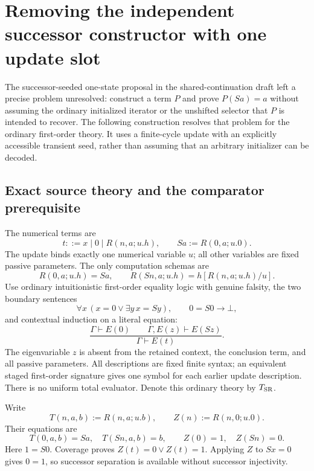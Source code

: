 \section{Removing the independent successor constructor with one update slot}
\label{sec:sr-predecessor}

The successor-seeded one-state proposal in the shared-continuation draft
left a precise problem unresolved: construct a term $P$ and prove
$P(Sa)=a$ without assuming the ordinary initialized iterator or the
unshifted selector that $P$ is intended to recover.  The following
construction resolves that problem for the ordinary first-order theory.
It uses a finite-cycle update with an explicitly accessible transient
seed, rather than assuming that an arbitrary initializer can be decoded.

\subsection{Exact source theory and the comparator prerequisite}

The numerical terms are
\[
 t::=x\mid0\mid R(n,a;u.h),\qquad Sa:=R(0,a;u.0).
\]
The update binds exactly one numerical variable $u$; all other variables
are fixed passive parameters.  The only computation schemas are
\[
 R(0,a;u.h)=Sa,\qquad
 R(Sn,a;u.h)=h[R(n,a;u.h)/u].
 \tag{SR}\label{eq:sr-source}
\]
Use ordinary intuitionistic first-order equality logic with genuine
falsity, the two boundary sentences
\[
 \forall x\,(x=0\vee\exists y\,x=Sy),\qquad 0=S0\longrightarrow\bot,
\]
and contextual induction on a literal equation:
\[
 \frac{\Gamma\vdash E(0)\qquad\Gamma,E(z)\vdash E(Sz)}
      {\Gamma\vdash E(t)}.
 \tag{EI}\label{eq:sr-ei}
\]
The eigenvariable $z$ is absent from the retained context, the conclusion
term, and all passive parameters.  All descriptions are fixed finite
syntax; an equivalent staged first-order signature gives one symbol
for each earlier update description.  There is no uniform total evaluator.
Denote this ordinary theory by $T_{\rm SR}$.

Write
\[
 T(n,a,b):=R(n,a;u.b),\qquad Z(n):=R(n,0;u.0).
\]
Their equations are
\[
 T(0,a,b)=Sa,\quad T(Sn,a,b)=b,\qquad
 Z(0)=1,\quad Z(Sn)=0.
\]
Here $1=S0$.  Coverage proves $Z(t)=0\vee Z(t)=1$.  Applying $Z$ to
$Sx=0$ gives $0=1$, so successor separation is available without
successor injectivity.


